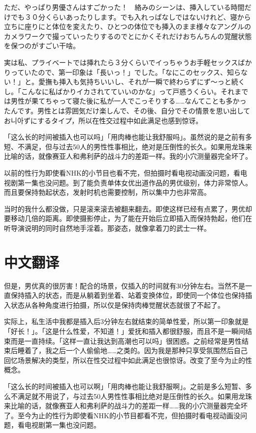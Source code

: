 \documentclass[12pt,UTF8]{ctexbook}
\begin{document}
ただ、やっぱり男優さんはすごかった！　絡みのシーンは、挿入している時間だけでも３０分くらいあったりします。でも入れっぱなしではないけれど、寝から立ちに座りにと体位を変えたり、ひとつの体位でも挿入のまま様々なアングルのカメラワークで撮っていったりするのでとにかくそれだけおちんちんの覚醒状態を保つのがすごい干啥。

実は私、プライベートでは挿れたら３分くらいでイっちゃうお手軽セックスばかりっていたので、第一印象は「長いっ！」でした。「なにこのセックス、知らない！」と。愛撫も挿入も気持ちいいし、それが一瞬で終わらずにず〜っと続くし。「こんなに私ばかりイカされてていいのかな」って戸惑うくらい。それまでは男性が果てちゃって寝た後に私が一人でこっそりする……なんてことも多かったんです。男性とは雰囲気だけ楽しんで、その後、自分でその情景を思い出してお니아ずにするタイプ，所以在性交过程中如此满足也感到惊讶。

「这么长的时间被插入也可以吗」「用肉棒也能让我舒服吗」。虽然说的是之前有多短、不满足，但与过去50人的男性性事相比，绝对是压倒性的长久。如果用龙珠来比喻的话，就像赛亚人和弗利萨的战斗力的差距一样。我的小穴测量器完全坏了。

以前的性行为即使看NHK的小节目也看不完，但拍摄时看电视动画没问题，看电视剧第一集也没问题。到了能负责单体女优出道作品的男优级别，体力非常惊人。而且要保持勃起状态，发射时机也需要控制，所以集中力也非常高。

当时的我什么都没做，只是滚来滚去被翻来翻去。即使这样已经有点累了，男优却要移动几倍的距离。即使摄影停止，为了能在开始后立即插入而保持勃起，他们在听导演说明的同时自然地手淫着。那姿态，就像拿着刀的武士一样。

\switchcolumn

\section*{中文翻译}

但是，男优真的很厉害！配合的场景，仅插入的时间就有30分钟左右。当然不是一直保持插入的状态，而是从躺着到坐着、站着变换体位，即使同一个体位也保持插入状态从各种角度进行拍摄，所以仅是保持肉棒觉醒状态就很了不起了。

实际上，私生活中我都是插入后3分钟左右就结束的简单性爱，所以第一印象就是「好长！」。「这是什么性爱，不知道！」爱抚和插入都很舒服，而且不是一瞬间结束而是一直持续。「这样一直让我达到高潮也可以吗」很困惑。之前经常是男性结束后睡着了，我之后一个人偷偷地……之类的。因为我是那种只享受氛围然后自己回忆场景解决的类型，所以在性交过程中如此满足也很惊讶。改变了至今为止的性概念。

「这么长的时间被插入也可以啊」「用肉棒也能让我舒服啊」。之前是多么短暂、多么不满足就不用说了，与过去50人男性性事相比绝对是压倒性的长久。如果用龙珠来比喻的话，就像赛亚人和弗利萨的战斗力的差距一样……我的小穴测量器完全坏了。至今为止的性行为即使看NHK的小节目都看不完，但拍摄时看电视动画没问题，看电视剧第一集也没问题。
\end{document}
